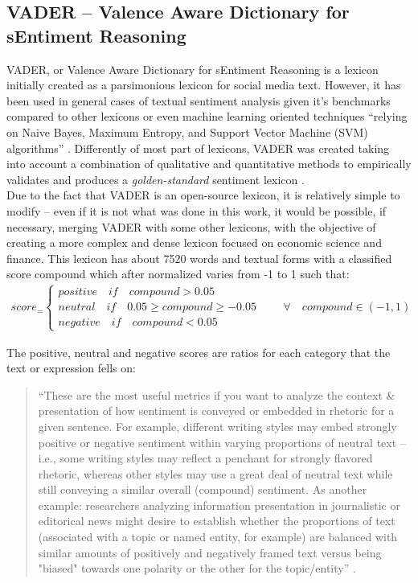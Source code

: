 \subsection{VADER – Valence Aware Dictionary for sEntiment Reasoning} \label{subsec:vader}

VADER, or Valence Aware Dictionary for sEntiment Reasoning is a lexicon initially created as a parsimonious lexicon for social media text. However, it has been used in general cases of textual sentiment analysis given it's benchmarks compared to other lexicons or even machine learning oriented techniques ``relying on Naive Bayes, Maximum Entropy, and Support Vector Machine (SVM) algorithms'' \citep[p.216]{hutto2014vader}. Differently of most part of lexicons, VADER was created taking into account a combination of qualitative and quantitative methods to empirically validates and produces a \textit{golden-standard} sentiment lexicon \cite{hutto2014vader}.\\

Due to the fact that VADER is an open-source lexicon, it is relatively simple to modify -- even if it is not what was done in this work, it would be possible, if necessary, merging VADER with some other lexicons, with the objective of creating a more complex and dense lexicon focused on economic science and finance. This lexicon has about 7520 words and textual forms with a classified score compound which after normalized varies from -1 to 1 such that:
\begin{align} \label{eq:vaadercoumpond}
    score_ = \begin{cases}
                positive\quad if \quad compound > 0.05\\
                neutral\quad if \quad 0.05 \geq compound \geq -0.05\\
                negative\quad if \quad compound < 0.05
              \end{cases} \qquad \forall\quad compound \in (-1, 1)
\end{align}

The positive, neutral and negative scores are ratios for each category that the text or expression fells on: 
\begin{quote}
    ``These are the most useful metrics if you want to analyze the context \& presentation of how sentiment is conveyed or embedded in rhetoric for a given sentence. For example, different writing styles may embed strongly positive or negative sentiment within varying proportions of neutral text -- i.e., some writing styles may reflect a penchant for strongly flavored rhetoric, whereas other styles may use a great deal of neutral text while still conveying a similar overall (compound) sentiment. As another example: researchers analyzing information presentation in journalistic or editorical news might desire to establish whether the proportions of text (associated with a topic or named entity, for example) are balanced with similar amounts of positively and negatively framed text versus being "biased" towards one polarity or the other for the topic/entity'' \cite{vadergit}.
\end{quote}

